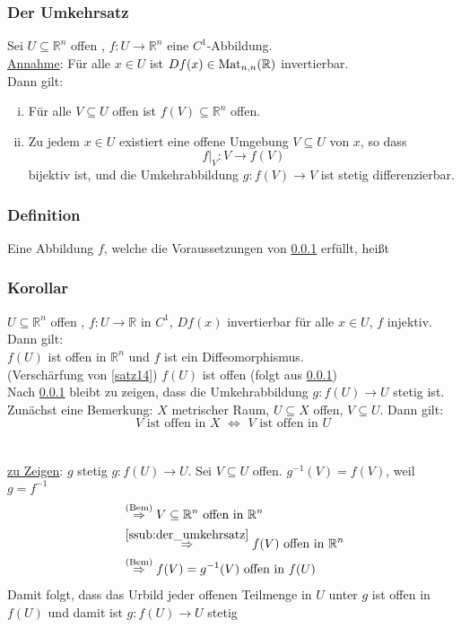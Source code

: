 \subsubsection{Der Umkehrsatz} %
\label{ssub:der_umkehrsatz}
Sei $ U \subseteq \mathbb{R}^n$ offen , $ f: U \to \mathbb{R}^n $ eine $C^1$-Abbildung. \\
\underline{Annahme}: Für alle $x \in U$ ist $Df(x) \in \operatorname{Mat}_{n,n}(\mathbb{R})$ invertierbar. \\
Dann gilt:
\begin{enumerate}[(i)]
	\item Für alle $V \subseteq U$ offen ist $f(V) \subseteq \mathbb{R}^n$ offen.
	\item Zu jedem $x \in U$ existiert eine offene Umgebung $V \subseteq U$ von $x$, so dass
	\[
		f  \Big|_{V}^{}: V \to f(V)
	\]
	bijektiv ist, und die Umkehrabbildung $g:f(V) \to V$ ist stetig differenzierbar.
\end{enumerate}
\subsubsection{Definition} %
\label{ssub:definition}
Eine Abbildung $f$, welche die Voraussetzungen von \ref{ssub:der_umkehrsatz} erfüllt, heißt 

\subsubsection{Korollar} %
\label{ssub:korollar}
$ U \subseteq \mathbb{R}^n$ offen , $ f: U \to \mathbb{R} $ in $C^1$, $Df(x)$ invertierbar für alle $x \in U$, $f$ injektiv.
Dann gilt: \\
$f(U)$ ist offen in $\mathbb{R}^n$ und $f$ ist ein Diffeomorphismus. \\
(Verschärfung von \ref{satz14})
 $f(U)$ ist offen (folgt aus \ref{ssub:der_umkehrsatz}) \\
Nach \ref{ssub:der_umkehrsatz} bleibt zu zeigen, dass die Umkehrabbildung $g: f(U) \to U$ stetig ist. Zunächst eine Bemerkung:
 $X$ metrischer Raum, $U \subseteq X$ offen, $V \subseteq U$. Dann gilt: 
\[
	V \text{ ist offen in $X$} \,\, \Leftrightarrow \,\, V \text{ ist offen in $U$}
\] \\
\\
\underline{zu Zeigen}: $g$ stetig
$g:f(U) \to U$. Sei $V \subseteq U$ offen. $g^{-1}(V)=f(V)$, weil $g=f^{-1}$
\begin{align*}
	& \stackrel{\text{(Bem)}}{\Rightarrow } V \subseteq \mathbb{R}^n \text{ offen in } \mathbb{R}^n \\
	& \stackrel{\ref{ssub:der_umkehrsatz}}{\Rightarrow} f(V) \text{ offen in } \mathbb{R}^n \\
	& \stackrel{\text{(Bem)}}{\Rightarrow }f(V)=g^{-1}(V) \text{ offen in }f(U) \\
\end{align*}
Damit folgt, dass das Urbild jeder offenen Teilmenge in $U$ unter $g$ ist offen in $f(U)$ und damit ist $g:f(U) \to U$ stetig
\bewende
